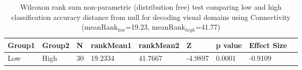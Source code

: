 \begin{table}
\centering
\begin{tabular}[0.2em]{@{}lllllllll@{}}\toprule
Group1 & Group2 & N & rankMean1 & rankMean2 & Z & p value & Effect Size\\\toprule[0.2em]
Low & High & 30 & 19.2334 & 41.7667 & -4.9897 & 0.0001 & -0.9109 \\\bottomrule[0.2em]
\end{tabular}
\caption{Wilcoxon rank sum non-parametric (distribution free) test comparing low and high classification accuracy distance from null for decoding visual domains using Connectivity (meanRank$_{low}$=19.23, meanRank$_{high}$=41.77)\label{tabel:null}}
\end{table}
